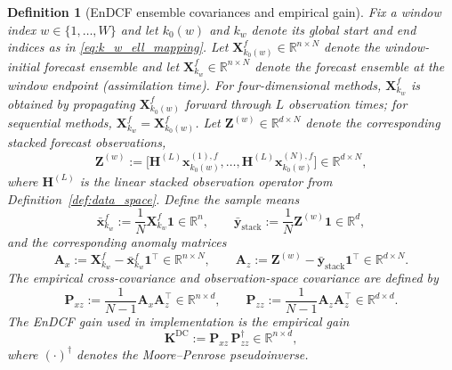 \documentclass[11pt,a4paper]{article}
\newtheorem{definition}{Definition}
\begin{document}
\begin{definition}[EnDCF ensemble covariances and empirical gain]
\label{def:endcf_gain_ensemble}
Fix a window index $w\in\{1,\ldots,W\}$ and let $k_0(w)$ and $k_w$ denote its global start and end indices as in \eqref{eq:k_w_ell_mapping}. Let $\mathbf{X}_{k_0(w)}^{f}\in\mathbb{R}^{n\times N}$ denote the window-initial forecast ensemble and let $\mathbf{X}_{k_w}^{f}\in\mathbb{R}^{n\times N}$ denote the forecast ensemble at the window endpoint (assimilation time). For four-dimensional methods, $\mathbf{X}_{k_w}^{f}$ is obtained by propagating $\mathbf{X}_{k_0(w)}^{f}$ forward through $L$ observation times; for sequential methods, $\mathbf{X}_{k_w}^{f}=\mathbf{X}_{k_0(w)}^{f}$. Let $\mathbf{Z}^{(w)}\in\mathbb{R}^{d\times N}$ denote the corresponding stacked forecast observations,
\begin{equation}
\mathbf{Z}^{(w)}
:=
\bigl[
\mathbf{H}^{(L)}\mathbf{x}_{k_0(w)}^{(1),f},
\ldots,
\mathbf{H}^{(L)}\mathbf{x}_{k_0(w)}^{(N),f}
\bigr]
\in\mathbb{R}^{d\times N},
\end{equation}
where $\mathbf{H}^{(L)}$ is the linear stacked observation operator from Definition~\ref{def:data_space}.
Define the sample means
\begin{equation}
\bar{\mathbf{x}}_{k_w}^{f}
:=
\frac{1}{N}\mathbf{X}_{k_w}^{f}\mathbf{1}\in\mathbb{R}^{n},
\qquad
\bar{\mathbf{y}}_{\mathrm{stack}}
:=
\frac{1}{N}\mathbf{Z}^{(w)}\mathbf{1}\in\mathbb{R}^{d},
\end{equation}
and the corresponding anomaly matrices
\begin{equation}
\mathbf{A}_x
:=
\mathbf{X}_{k_w}^{f}-\bar{\mathbf{x}}_{k_w}^{f}\mathbf{1}^\top
\in\mathbb{R}^{n\times N},
\qquad
\mathbf{A}_z
:=
\mathbf{Z}^{(w)}-\bar{\mathbf{y}}_{\mathrm{stack}}\mathbf{1}^\top
\in\mathbb{R}^{d\times N}.
\end{equation}
The empirical cross-covariance and observation-space covariance are defined by
\begin{equation}
\mathbf{P}_{xz}
:=
\frac{1}{N-1}\mathbf{A}_x\mathbf{A}_z^\top
\in\mathbb{R}^{n\times d},
\qquad
\mathbf{P}_{zz}
:=
\frac{1}{N-1}\mathbf{A}_z\mathbf{A}_z^\top
\in\mathbb{R}^{d\times d}.
\end{equation}
The EnDCF gain used in implementation is the empirical gain
\begin{equation}
\mathbf{K}^{\mathrm{DC}}
:=
\mathbf{P}_{xz}\,\mathbf{P}_{zz}^{\dagger}
\in\mathbb{R}^{n\times d},
\label{eq:endcf_gain_pinv}
\end{equation}
where $(\cdot)^{\dagger}$ denotes the Moore--Penrose pseudoinverse.
\end{definition}
\end{document}
